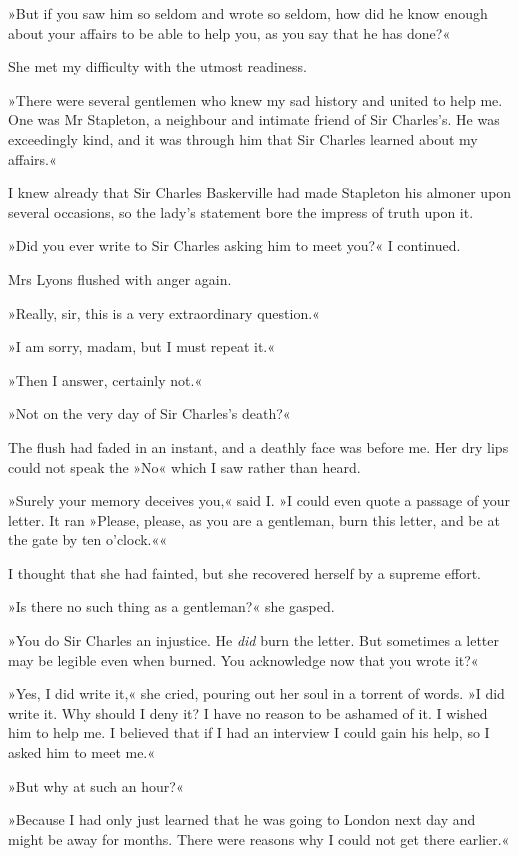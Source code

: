 »But if you saw him so seldom and wrote so seldom, how did he know enough about your affairs to be able to help you, as you say that he has done?«

She met my difficulty with the utmost readiness.

»There were several gentlemen who knew my sad history and united to help me. One was Mr Stapleton, a neighbour and intimate friend of Sir Charles's. He was exceedingly kind, and it was through him that Sir Charles learned about my affairs.«

I knew already that Sir Charles Baskerville had made Stapleton his almoner upon several occasions, so the lady's statement bore the impress of truth upon it.

»Did you ever write to Sir Charles asking him to meet you?« I continued.

Mrs Lyons flushed with anger again.

»Really, sir, this is a very extraordinary question.«

»I am sorry, madam, but I must repeat it.«

»Then I answer, certainly not.«

»Not on the very day of Sir Charles's death?«

The flush had faded in an instant, and a deathly face was before me. Her dry lips could not speak the »No« which I saw rather than heard.

»Surely your memory deceives you,« said I. »I could even quote a passage of your letter. It ran »Please, please, as you are a gentleman, burn this letter, and be at the gate by ten o'clock.««

I thought that she had fainted, but she recovered herself by a supreme effort.

»Is there no such thing as a gentleman?« she gasped.

»You do Sir Charles an injustice. He \emph{did} burn the letter. But sometimes a letter may be legible even when burned. You acknowledge now that you wrote it?«

»Yes, I did write it,« she cried, pouring out her soul in a torrent of words. »I did write it. Why should I deny it? I have no reason to be ashamed of it. I wished him to help me. I believed that if I had an interview I could gain his help, so I asked him to meet me.«

»But why at such an hour?«

»Because I had only just learned that he was going to London next day and might be away for months. There were reasons why I could not get there earlier.«


